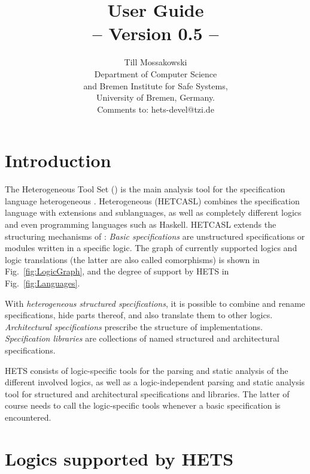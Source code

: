 \documentclass{article}
\newcommand{\normalTEXTSC}[2]{{#1\scriptsize#2}}
\newcommand{\LARGETEXTSC} [2]{{\LARGE     #1\large     #2}}
\newcommand     {\Hets}{\normalTEXTSC{H}{ETS}\xspace}
\newcommand{\LARGEHets} {\LARGETEXTSC{H}{ETS}\xspace}
\newcommand{\HetCASL}{\normalTEXTSC{H}{ET}\normalTEXTSC{C}{ASL}\xspace}
\begin{document}
\title{{\bf \protect{\LARGEHets} User Guide}\\ 
-- Version 0.5 --}
\author{Till Mossakowski\\[1em]
Department of Computer Science\\ and Bremen
Institute for Safe Systems,\\ University of Bremen, Germany.\\[1em]
Comments to: hets-devel@tzi.de
}

\maketitle

\section{Introduction}


The Heterogeneous Tool Set (\protect\Hets) is the main analysis tool
for the specification language heterogeneous \CASL. Heterogeneous
\CASL (\HetCASL) combines the specification language \CASL with \CASL extensions
and sublanguages, as well as completely different logics and even
programming languages such as Haskell. \HetCASL
extends the structuring mechanisms of \CASL:
\emph{Basic specifications} are
unstructured specifications or modules written in a specific logic.
The graph of currently supported logics and logic translations (the
latter are also called comorphisms) is shown in
Fig.~\ref{fig:LogicGraph}, and the degree of support by \Hets in
Fig.~\ref{fig:Languages}.

With \emph{heterogeneous structured specifications}, it is possible to
combine and rename specifications, hide parts thereof, and also
translate them to other logics. \emph{Architectural specifications}
prescribe the structure of implementations.  \emph{Specification
  libraries} are collections of named structured and architectural
specifications. 

\Hets consists of logic-specific tools for the parsing and static
analysis of the different involved logics, as well as a
logic-independent parsing and static analysis tool for structured and
architectural specifications and libraries. The latter of course needs
to call the logic-specific tools whenever a basic specification is
encountered.

\section{Logics supported by \Hets}
\end{document}
